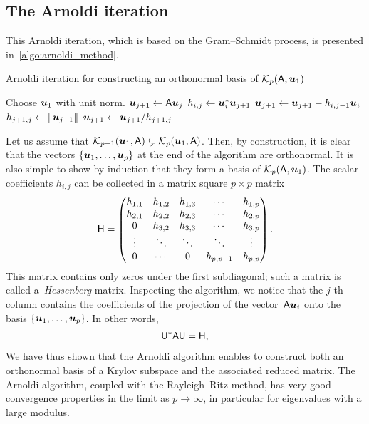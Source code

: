 \subsection{The Arnoldi iteration}
This Arnoldi iteration, which is based on the Gram--Schmidt process,
is presented in~\cref{algo:arnoldi_method}.
\begin{algorithm}
\caption{Arnoldi iteration for constructing an orthonormal basis of $\mathcal K_p(\mathsf A, \mathbf{\boldsymbol{u}}_1)$}%
\label{algo:arnoldi_method}%
\begin{algorithmic}
\State Choose $\mathbf{\boldsymbol{u}}_1$ with unit norm.
    \State $\mathbf{\boldsymbol{u}}_{j+1} \gets \mathsf A \mathbf{\boldsymbol{u}}_{j}$
        \State $h_{i,j} \gets \mathbf{\boldsymbol{u}}_{i}^* \mathbf{\boldsymbol{u}}_{j+1}$
        \State $\mathbf{\boldsymbol{u}}_{j+1} \gets \mathbf{\boldsymbol{u}}_{j+1} - h_{i,j-1} \mathbf{\boldsymbol{u}}_{i}$
    \EndFor
    \State $h_{j+1,j} \gets \lVert\mathbf{\boldsymbol{u}}_{j+1}\rVert$
    \State $\mathbf{\boldsymbol{u}}_{j+1} \gets \mathbf{\boldsymbol{u}}_{j+1} / h_{j+1,j}$
\EndFor
\end{algorithmic}
\end{algorithm}

Let us assume that $\mathcal K_{p-1}(\mathbf{\boldsymbol{u}}_1, \mathsf A) \subsetneq \mathcal K_p(\mathbf{\boldsymbol{u}}_1, \mathsf A)$.
Then, by construction,
it is clear that the vectors $\{\mathbf{\boldsymbol{u}}_1, \dotsc, \mathbf{\boldsymbol{u}}_p\}$ at the end of the algorithm are orthonormal.
It is also simple to show by induction that they form a basis of $\mathcal K_p(\mathsf A, \mathbf{\boldsymbol{u}}_1)$.
The scalar coefficients $h_{i,j}$ can be collected in a matrix square $p \times p$ matrix
\[
    \mathsf H
    =
    \begin{pmatrix}
        h_{1,1} & h_{1,2} & h_{1,3} & \cdots  & h_{1,p} \\
        h_{2,1} & h_{2,2} & h_{2,3} & \cdots  & h_{2,p} \\
        0       & h_{3,2} & h_{3,3} & \cdots  & h_{3,p} \\
        \vdots  & \ddots  & \ddots  & \ddots  & \vdots  \\
        0       & \cdots  & 0     & h_{p,p-1} & h_{p,p}
    \end{pmatrix}.
\]
This matrix contains only zeros under the first subdiagonal;
such a matrix is called a~\emph{Hessenberg} matrix.
Inspecting the algorithm,
we notice that the $j$-th column contains the coefficients of the projection of the vector~$\mathsf A \mathbf{\boldsymbol{u}}_i$ onto the basis $\{\mathbf{\boldsymbol{u}}_1, \dotsc, \mathbf{\boldsymbol{u}}_p\}$.
In other words,
\begin{align}
    \label{eq:reduced_matrix_arnoldi}
    \mathsf U^* \mathsf A \mathsf U = \mathsf H,
\end{align}
We have thus shown that the Arnoldi algorithm enables to construct both an orthonormal basis of a Krylov subspace and
the associated reduced matrix.
The Arnoldi algorithm, coupled with the Rayleigh--Ritz method,
has very good convergence properties in the limit as $p \to \infty$,
in particular for eigenvalues with a large modulus.

